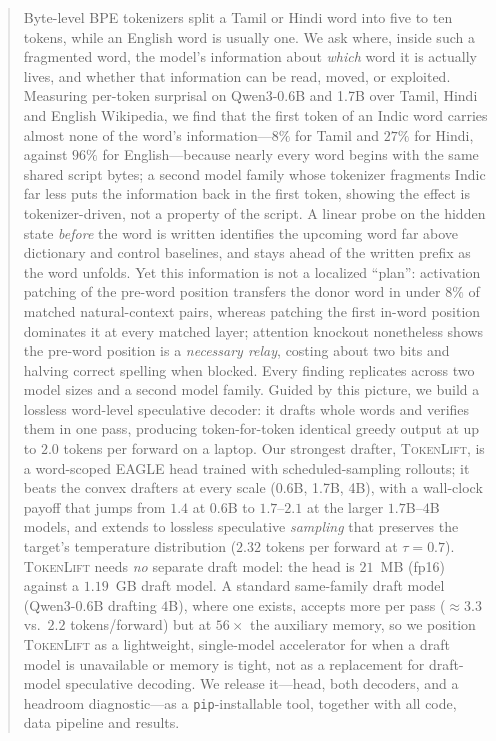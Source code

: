 \begin{abstract}
Byte-level BPE tokenizers split a Tamil or Hindi word into five to ten
tokens, while an English word is usually one. We ask where, inside such a
fragmented word, the model's information about \emph{which} word it is
actually lives, and whether that information can be read, moved, or exploited.
Measuring per-token surprisal on Qwen3-0.6B and 1.7B over Tamil, Hindi and
English Wikipedia, we find that the first token of an Indic word carries
almost none of the word's information---$8\%$ for Tamil and $27\%$ for Hindi,
against $96\%$ for English---because nearly every word begins with the same
shared script bytes; a second model family whose tokenizer fragments Indic far
less puts the information back in the first token, showing the effect is
tokenizer-driven, not a property of the script. A linear probe on the hidden
state \emph{before} the word
is written identifies the upcoming word far above dictionary and control
baselines, and stays ahead of the written prefix as the word unfolds. Yet this
information is not a localized ``plan'': activation patching of the pre-word
position transfers the donor word in under $8\%$ of matched natural-context
pairs, whereas patching the first in-word position dominates it at every matched
layer; attention
knockout nonetheless shows the pre-word position is a \emph{necessary relay},
costing about two bits and halving correct spelling when blocked. Every finding
replicates across two model sizes and a second model family. Guided by this
picture, we build a lossless word-level speculative decoder: it drafts whole
words and verifies them in one pass, producing token-for-token identical greedy
output at up to $2.0$ tokens per forward on a laptop. Our strongest drafter,
\textsc{TokenLift}, is a word-scoped EAGLE head trained with scheduled-sampling
rollouts; it beats the convex drafters at every scale (0.6B, 1.7B, 4B), with a
wall-clock payoff that jumps from \x$1.4$ at $0.6$B to \x$1.7$--\x$2.1$ at the
larger $1.7$B--$4$B models, and extends to lossless speculative \emph{sampling}
that preserves the target's
temperature distribution ($2.32$ tokens per forward at $\tau{=}0.7$).
\textsc{TokenLift} needs \emph{no} separate draft model: the head is $21$~MB
(fp16) against a $1.19$~GB draft model. A standard same-family draft model
(Qwen3-0.6B drafting $4$B), where one exists, accepts more per pass
($\approx\!3.3$ vs.\ $2.2$ tokens/forward) but at $56\times$ the auxiliary
memory, so we position \textsc{TokenLift} as a lightweight, single-model
accelerator for when a draft model is unavailable or memory is tight, not as a
replacement for draft-model speculative decoding. We
release it---head, both decoders, and a headroom diagnostic---as a
\texttt{pip}-installable tool, together with all code, data pipeline and
results.
\end{abstract}


